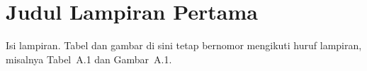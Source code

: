 \chapter{Judul Lampiran Pertama}\label{lam:a}

Isi lampiran. Tabel dan gambar di sini tetap bernomor mengikuti huruf lampiran,
misalnya Tabel~A.1 dan Gambar~A.1.
